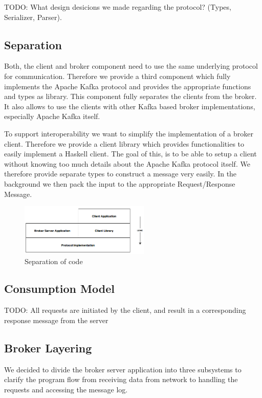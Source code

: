 TODO: What design desicions we made regarding the protocol? (Types, Serializer,
Parser). 

\subsection{Separation} 
\label{sec:separation}
Both, the client and broker component need to use the same underlying protocol for
communication. Therefore we provide a third component which fully implements the Apache Kafka
protocol  and provides the appropriate functions and types as library.
This component fully separates the clients from the broker. It also allows to
use the clients with other Kafka based broker implementations, especially Apache
Kafka itself. 

To support interoperability we want to simplify the implementation of a broker
client. Therefore we provide a client library which provides functionalities to
easily implement a Haskell client. The goal of this, is to be able to
setup a client without knowing too much details about the Apache Kafka protocol
itself. We therefore provide separate types to construct a message very easily.
In the background we then pack the input to the appropriate Request/Response
Message. 

\begin{figure}[H]
    \centering
    \includegraphics[width=0.55\textwidth]{images/architecture-components.png}
    \caption{Separation of code}
    \label{fig:architecture-components.png}
\end{figure}

\subsection{Consumption Model}
TODO: All requests are initiated by the client, and result in a corresponding
response message from the server

\subsection{Broker Layering}
We decided to divide the broker server application into three subsystems to
clarify the program flow from receiving data from network to handling the
requests and accessing the message log. 
